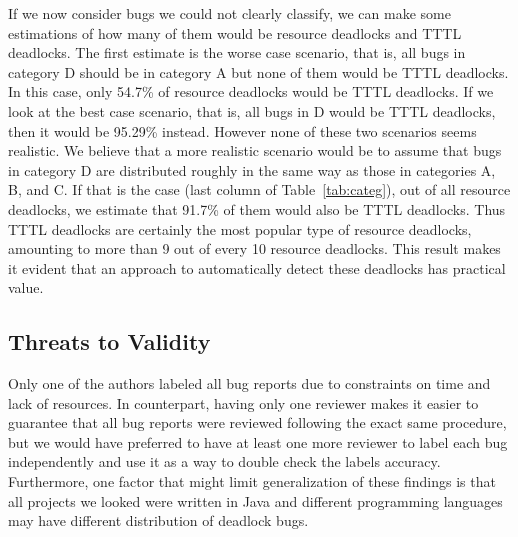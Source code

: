 If we now consider bugs we could not clearly classify, we can make some estimations of how many of them would be resource deadlocks and TTTL deadlocks. The first estimate is the worse case scenario, that is, all bugs in category D should be in category A but none of them would be TTTL deadlocks. In this case, only 54.7\% of resource deadlocks would be TTTL deadlocks. If we look at the best case scenario, that is, all bugs in D would be TTTL deadlocks, then it would be 95.29\% instead. However none of these two scenarios seems realistic. We believe that a more realistic scenario would be to assume that bugs in category D are distributed roughly in the same way as those in categories A, B, and C. If that is the case (last column of Table~\ref{tab:categ}), out of all resource deadlocks, we estimate that 91.7\% of them would also be TTTL deadlocks. Thus TTTL deadlocks are certainly the most popular type of resource deadlocks, amounting to more than 9 out of every 10 resource deadlocks. This result makes it evident that an approach to automatically detect these deadlocks has practical value.  

\subsection{Threats to Validity}

Only one of the authors labeled all bug reports due to constraints on time and lack of resources. In counterpart, having only one reviewer makes it easier to guarantee that all bug reports were reviewed following the exact same procedure, but we would have preferred to have at least one more reviewer to label each bug independently and use it as a way to double check the labels accuracy. Furthermore, one factor that might limit generalization of these findings is that all projects we looked were written in Java and different programming languages may have different distribution of deadlock bugs.
